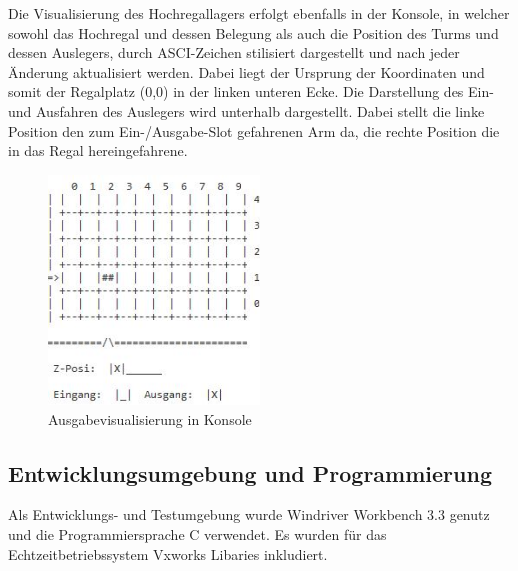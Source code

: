 Die Visualisierung des Hochregallagers erfolgt ebenfalls in der Konsole, in welcher sowohl das Hochregal und dessen Belegung als auch die Position des Turms und dessen Auslegers, durch ASCI-Zeichen stilisiert dargestellt und nach jeder Änderung aktualisiert werden.
Dabei liegt der Ursprung der Koordinaten und somit der Regalplatz (0,0) in der linken unteren Ecke.
Die Darstellung des Ein- und Ausfahren des Auslegers wird unterhalb dargestellt. Dabei stellt die linke Position den zum Ein-/Ausgabe-Slot gefahrenen Arm da, die rechte Position die in das Regal hereingefahrene.
\begin{figure}[H]
	\centering
  \includegraphics[width=0.5\textwidth]{diagrams/console_output.JPG}
	\caption{Ausgabevisualisierung in Konsole}
	\label{fig3}
\end{figure}

\subsection{Entwicklungsumgebung und Programmierung}
Als Entwicklungs- und Testumgebung wurde Windriver Workbench 3.3 genutz und die Programmiersprache C verwendet.
Es wurden für das Echtzeitbetriebssystem Vxworks Libaries inkludiert.


